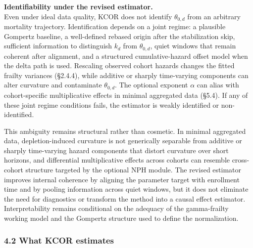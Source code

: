 \documentclass[
]{article}
\begin{document}
\textbf{Identifiability under the revised estimator.}\\
Even under ideal data quality, KCOR does not identify \(\theta_{0,d}\) from an arbitrary mortality trajectory. Identification depends on a joint regime: a plausible Gompertz baseline, a well-defined rebased origin after the stabilization skip, sufficient information to distinguish \(k_d\) from \(\theta_{0,d}\), quiet windows that remain coherent after alignment, and a structured cumulative-hazard offset model when the delta path is used. Rescaling observed cohort hazards changes the fitted frailty variances (§2.4.4), while additive or sharply time-varying components can alter curvature and contaminate \(\theta_{0,d}\). The optional exponent \(\alpha\) can alias with cohort-specific multiplicative effects in minimal aggregated data (§5.4). If any of these joint regime conditions fails, the estimator is weakly identified or non-identified.

This ambiguity remains structural rather than cosmetic. In minimal aggregated data, depletion-induced curvature is not generically separable from additive or sharply time-varying hazard components that distort curvature over short horizons, and differential multiplicative effects across cohorts can resemble cross-cohort structure targeted by the optional NPH module. The revised estimator improves internal coherence by aligning the parameter target with enrollment time and by pooling information across quiet windows, but it does not eliminate the need for diagnostics or transform the method into a causal effect estimator. Interpretability remains conditional on the adequacy of the gamma-frailty working model and the Gompertz structure used to define the normalization.

\subsubsection{4.2 What KCOR estimates}\label{what-kcor-estimates}
\end{document}
